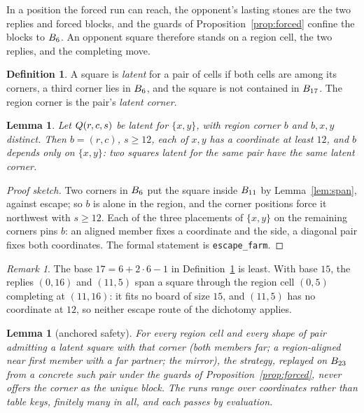 \documentclass[11pt]{amsart}
\newtheorem{lemma}[theorem]{Lemma}
\theoremstyle{definition}
\newtheorem{definition}[theorem]{Definition}
\theoremstyle{remark}
\newtheorem{remark}[theorem]{Remark}
\begin{document}
In a position the forced run can reach, the opponent's lasting
stones are the two replies and forced blocks, and the guards of
Proposition~\ref{prop:forced} confine the blocks to $B_6$. An
opponent square therefore stands on a region cell, the two replies,
and the completing move.

\begin{definition}\label{def:latent}
A square is \emph{latent} for a pair of cells if both cells are
among its corners, a third corner lies in $B_6$, and the square
is not contained in $B_{17}$. The region corner is the pair's
\emph{latent corner}.
\end{definition}

\begin{lemma}\label{lem:dichotomy}
Let $Q(r,c,s)$ be latent for $\{x, y\}$, with region corner $b$
and $b, x, y$ distinct. Then $b = (r,c)$, $s \ge 12$, each of $x, y$
has a coordinate at least $12$, and $b$ depends only on $\{x, y\}$:
two squares latent for the same pair have the same latent corner.
\end{lemma}

\begin{proof}[Proof sketch]
Two corners in $B_6$ put the square inside $B_{11}$ by
Lemma~\ref{lem:span}, against escape; so $b$ is alone in the region,
and the corner positions force it northwest with $s \ge 12$. Each of
the three placements of $\{x, y\}$ on the remaining corners pins
$b$: an aligned member fixes a coordinate and the side, a diagonal
pair fixes both coordinates. The formal statement is
\texttt{escape\_farm}.
\end{proof}

\begin{remark}
The base $17 = 6 + 2 \cdot 6 - 1$ in Definition~\ref{def:latent} is
least. With base $15$, the replies $(0,16)$ and $(11,5)$ span a
square through the region cell $(0,5)$ completing at $(11,16)$: it
fits no board of size $15$, and $(11,5)$ has no coordinate at
$12$, so neither escape route of the dichotomy applies.
\end{remark}

\begin{lemma}[anchored safety]\label{lem:anchors}
For every region cell and every shape of pair admitting a latent
square with that corner (both members far; a region-aligned near
first member with a far partner; the mirror), the strategy, replayed
on $B_{23}$ from a concrete such pair under the guards of
Proposition~\ref{prop:forced}, never offers the corner as the unique
block. The runs range over coordinates rather than table keys,
finitely many in all, and each passes by evaluation.
\end{lemma}
\end{document}
